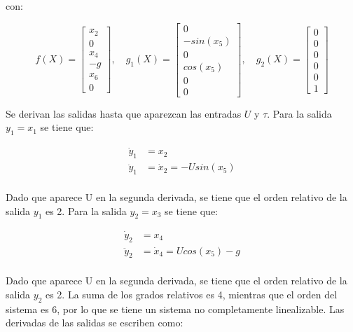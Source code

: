 con:

\begin{equation*}
    f(X)=\begin{bmatrix}
        x_2\\0\\x_4\\-g\\x_6\\0
    \end{bmatrix},\quad g_1(X)=\begin{bmatrix}
        0\\-sin(x_5)\\0\\cos(x_5)\\0\\0
    \end{bmatrix},\quad g_2(X)=\begin{bmatrix}
        0\\0\\0\\0\\0\\1
    \end{bmatrix}
\end{equation*}

Se derivan las salidas hasta que aparezcan las entradas \(U\) y \(\tau\). Para la salida \(y_1=x_1\) se tiene que:

\begin{equation*}
    \begin{aligned}
        \dot{y}_1&=x_2\\
        \ddot{y}_1&=\dot{x}_2=-U sin(x_5)\\
    \end{aligned}
\end{equation*}

Dado que aparece U en la segunda derivada, se tiene que el orden relativo de la salida \(y_1\) es 2. Para la salida \(y_2=x_3\) se tiene que:

\begin{equation*}
    \begin{aligned}
        \dot{y}_2&=x_4\\
        \ddot{y}_2&=\dot{x}_4=U cos(x_5)-g\\
    \end{aligned}
\end{equation*}

Dado que aparece U en la segunda derivada, se tiene que el orden relativo de la salida \(y_2\) es 2. La suma de los grados relativos es 4, mientras que el orden del sistema es 6, por lo que se tiene un sistema no completamente linealizable. Las derivadas de las salidas se escriben como:

